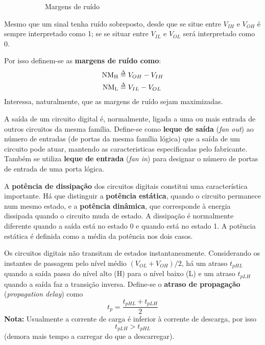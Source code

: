 \begin{figure}[H]
\begin{subfigure}[b]{0.3\linewidth}
        \caption{Margens de ruído \cite{medeiros:CTBM}}
        \label{fig:noise-margins}
    \end{subfigure}
    \caption{}
\end{figure}

\vspace{-0.75em}
\noindent Mesmo que um sinal tenha ruído sobreposto, desde que se situe entre $V_{IH}$ e $V_{OH}$ é sempre interpretado como 1; se se situar entre $V_{IL}$ e $V_{OL}$ será interpretado como 0.

\begin{mdframed}
    Por isso definem-se as \textbf{margens de ruído como}:
    $$\begin{aligned}
        \text{NM}_\text{H} &\delequal V_{OH} - V_{IH} \\
        \text{NM}_\text{L} &\delequal V_{IL} - V_{OL}
    \end{aligned}$$
    \noindent Interessa, naturalmente, que as margens de ruído sejam maximizadas.
\end{mdframed}

\noindent A saída de um circuito digital é, normalmente, ligada a uma ou mais entrada de outros circuitos da mesma família. Define-se como \textbf{leque de saída} (\textit{fan out}) ao número de entradas (de portas da mesma família lógica) que a saída de um circuito pode atuar, mantendo as caracteristicas especificadas pelo fabricante. Também se utiliza \textbf{leque de entrada} (\textit{fan in}) para designar o número de portas de entrada de uma porta lógica.

A \textbf{potência de dissipação} dos circuitos digitais constitui uma característica importante. Há que distinguir a \textbf{potência estática}, quando o circuito permanece num mesmo estado, e a \textbf{potência dinâmica}, que corresponde à energia dissipada quando o circuito muda de estado. A dissipação é normalmente diferente quando a saída está no estado 0 e quando está no estado 1. A potência estática é definida como a média da potência nos dois casos.

\noindent Os circuitos digitais não transitam de estados instantaneamente. Considerando os instantes de passagem pelo nível médio $(V_{OL} + V_{OH})/2$, há um atraso $t_{pHL}$ quando a saída passa do nível alto (H) para o nível baixo (L) e um atraso $t_{pLH}$ quando a saída faz a transição inversa. Define-se o \textbf{atraso de propagação} (\textit{propagation delay}) como
$$
    t_p = \frac{t_{pHL} + t_{pLH}}{2}
$$
\noindent \textbf{Nota:} Usualmente a corrente de carga é inferior à corrente de descarga, por isso
        $$
            t_{pLH} > t_{pHL}
        $$
\noindent (demora mais tempo a carregar do que a descarregar). 
        
